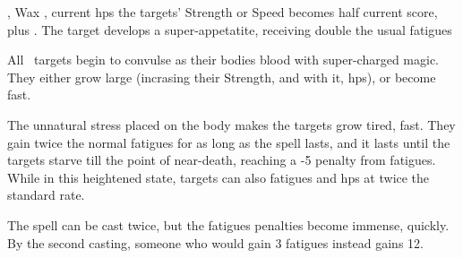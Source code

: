   {\mEarth,\mWater}%
  {Wax}%
  {\detailed,\duplicated}%
  {current \glspl{hp}}%
  {the targets' Strength or Speed becomes half current score, plus . The target develops a super-appetatite, receiving double the usual \glspl{fatigue}}%
  {
    All \spellArea\ targets begin to convulse as their bodies blood with super-charged magic.
    They either grow large (incrasing their Strength, and with it, \glspl{hp}), or become fast.

    The unnatural stress placed on the body makes the targets grow tired, fast.
    They gain twice the normal \glspl{fatigue} for as long as the spell lasts, and it lasts until the targets starve till the point of near-death, reaching a -5 penalty from \glspl{fatigue}.
    While in this heightened state, targets can also \glspl{fatigue} and \glspl{hp} at twice the standard rate.

    The spell can be cast twice, but the \glspl{fatigue} penalties become immense, quickly.
    By the second casting, someone who would gain 3 \glspl{fatigue} instead gains 12.
  }


